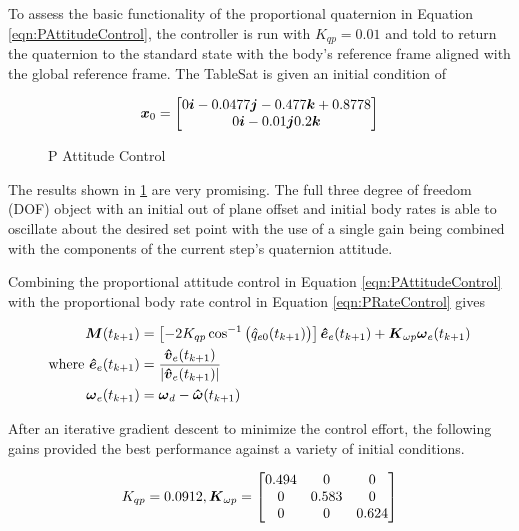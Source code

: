 To assess the basic functionality of the proportional quaternion in Equation \ref{eqn:PAttitudeControl}, the controller is run with $K_{qp} = 0.01$ and told to return the quaternion to the standard state with the body's reference frame aligned with the global reference frame.  The TableSat is given an initial condition of

\begin{equation}
  \boldsymbol{x}_0 = \begin{bmatrix} 0 \boldsymbol{i} -0.0477 \boldsymbol{j} -0.477 \boldsymbol{k} +0.8778 \\ 0 \boldsymbol{i} -0.01 \boldsymbol{j} 0.2 \boldsymbol{k} \end{bmatrix}
\end{equation}


\begin{figure}[H]
  \centerline{}
  \caption{P Attitude Control}
  \label{fig:PAttitudeControl}
\end{figure}

The results shown in \ref{fig:PAttitudeControl} are very promising.  The full three degree of freedom (DOF) object with an initial out of plane offset and initial body rates is able to oscillate about the desired set point with the use of a single gain being combined with the components of the current step's quaternion attitude.

Combining the proportional attitude control in Equation \ref{eqn:PAttitudeControl} with the proportional body rate control in Equation \ref{eqn:PRateControl} gives

\begin{subequations}
  \begin{align}
    \boldsymbol{M}(t_{k+1}) &= \left[-2 K_{qp} \cos^{-1} \big(\hat{q}_{e0}(t_{k+1}) \big) \right] \boldsymbol{\hat{e}}_e(t_{k+1}) + \boldsymbol{K}_{\omega p} \boldsymbol{\omega}_e(t_{k+1})\\
    \text{where } \boldsymbol{\hat{e}}_e(t_{k+1}) &= \frac{\boldsymbol{\hat{v}}_e(t_{k+1})}{|\boldsymbol{\hat{v}}_e(t_{k+1})|} \\
    \boldsymbol{\omega}_e(t_{k+1}) &= \boldsymbol{\omega}_d - \boldsymbol{\hat{\omega}}(t_{k+1})
  \end{align}
  \label{eqn:PAttitudeAndRateControl}
\end{subequations}

After an iterative gradient descent to minimize the control effort, the following gains provided the best performance against a variety of initial conditions.

\begin{equation}
  K_{qp} = 0.0912, \boldsymbol{K}_{\omega p} = \begin{bmatrix} 0.494 & 0 & 0 \\ 0 & 0.583 & 0 \\ 0 & 0 & 0.624 \end{bmatrix}
\end{equation}

